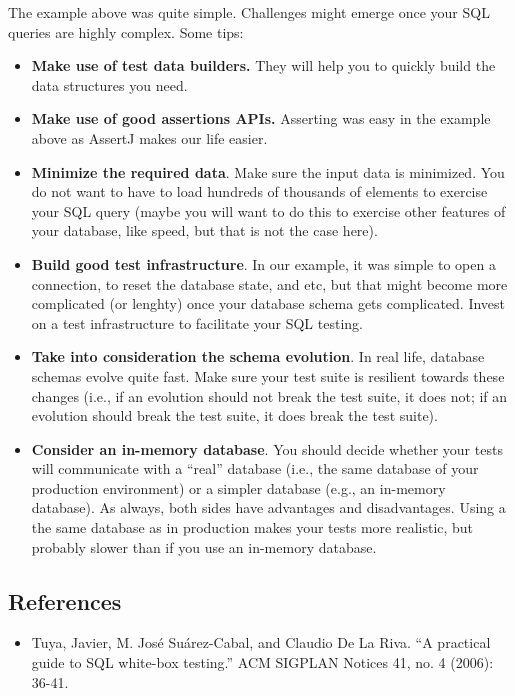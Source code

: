 The example above was quite simple. Challenges might emerge once your
SQL queries are highly complex. Some tips:

\begin{itemize}
\tightlist
\item
  \textbf{Make use of test data builders.} They will help you to quickly
  build the data structures you need.
\item
  \textbf{Make use of good assertions APIs.} Asserting was easy in the
  example above as AssertJ makes our life easier.
\item
  \textbf{Minimize the required data}. Make sure the input data is
  minimized. You do not want to have to load hundreds of thousands of
  elements to exercise your SQL query (maybe you will want to do this to
  exercise other features of your database, like speed, but that is not
  the case here).
\item
  \textbf{Build good test infrastructure}. In our example, it was simple
  to open a connection, to reset the database state, and etc, but that
  might become more complicated (or lenghty) once your database schema
  gets complicated. Invest on a test infrastructure to facilitate your
  SQL testing.
\item
  \textbf{Take into consideration the schema evolution}. In real life,
  database schemas evolve quite fast. Make sure your test suite is
  resilient towards these changes (i.e., if an evolution should not
  break the test suite, it does not; if an evolution should break the
  test suite, it does break the test suite).
\item
  \textbf{Consider an in-memory database}. You should decide whether
  your tests will communicate with a ``real'' database (i.e., the same
  database of your production environment) or a simpler database (e.g.,
  an in-memory database). As always, both sides have advantages and
  disadvantages. Using a the same database as in production makes your
  tests more realistic, but probably slower than if you use an in-memory
  database.
\end{itemize}

\hypertarget{references}{%
\subsection{References}\label{references}}

\begin{itemize}
\tightlist
\item
  Tuya, Javier, M. José Suárez-Cabal, and Claudio De La Riva. ``A
  practical guide to SQL white-box testing.'' ACM SIGPLAN Notices 41,
  no. 4 (2006): 36-41.
\end{itemize}
